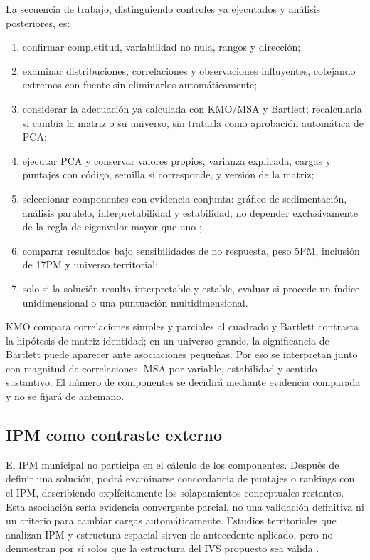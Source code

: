 La secuencia de trabajo, distinguiendo controles ya ejecutados y análisis posteriores, es:
\begin{enumerate}[leftmargin=1.27cm]
  \item confirmar completitud, variabilidad no nula, rangos y dirección;
  \item examinar distribuciones, correlaciones y observaciones influyentes, cotejando extremos con fuente sin eliminarlos automáticamente;
  \item considerar la adecuación ya calculada con KMO/MSA y Bartlett; recalcularla si cambia la matriz o su universo, sin tratarla como aprobación automática de PCA;
  \item ejecutar PCA y conservar valores propios, varianza explicada, cargas y puntajes con código, semilla si corresponde, y versión de la matriz;
  \item seleccionar componentes con evidencia conjunta: gráfico de sedimentación, análisis paralelo, interpretabilidad y estabilidad; no depender exclusivamente de la regla de eigenvalor mayor que uno \citep{horn1965rationale,jolliffe2002principal};
  \item comparar resultados bajo sensibilidades de no respuesta, peso 5PM, inclusión de 17PM y universo territorial;
  \item solo si la solución resulta interpretable y estable, evaluar si procede un índice unidimensional o una puntuación multidimensional.
\end{enumerate}

KMO compara correlaciones simples y parciales al cuadrado y Bartlett contrasta la hipótesis de matriz identidad; en un universo grande, la significancia de Bartlett puede aparecer ante asociaciones pequeñas. Por eso se interpretan junto con magnitud de correlaciones, MSA por variable, estabilidad y sentido sustantivo. El número de componentes se decidirá mediante evidencia comparada y no se fijará de antemano.

\subsection{IPM como contraste externo}

El IPM municipal no participa en el cálculo de los componentes. Después de definir una solución, podrá examinarse concordancia de puntajes o rankings con el IPM, describiendo explícitamente los solapamientos conceptuales restantes. Esta asociación sería evidencia convergente parcial, no una validación definitiva ni un criterio para cambiar cargas automáticamente. Estudios territoriales que analizan IPM y estructura espacial sirven de antecedente aplicado, pero no demuestran por sí solos que la estructura del IVS propuesto sea válida \citep{monsalvo2025ipm}.

